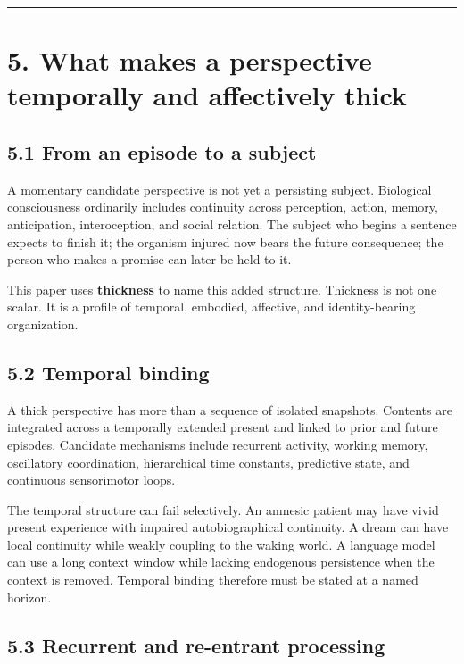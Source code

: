 \documentclass[
  11pt,
]{article}
\begin{document}
\begin{center}\rule{0.5\linewidth}{0.5pt}\end{center}

\section{5. What makes a perspective temporally and affectively
thick}\label{what-makes-a-perspective-temporally-and-affectively-thick}

\subsection{5.1 From an episode to a
subject}\label{from-an-episode-to-a-subject}

A momentary candidate perspective is not yet a persisting subject.
Biological consciousness ordinarily includes continuity across
perception, action, memory, anticipation, interoception, and social
relation. The subject who begins a sentence expects to finish it; the
organism injured now bears the future consequence; the person who makes
a promise can later be held to it.

This paper uses \textbf{thickness} to name this added structure.
Thickness is not one scalar. It is a profile of temporal, embodied,
affective, and identity-bearing organization.

\subsection{5.2 Temporal binding}\label{temporal-binding-1}

A thick perspective has more than a sequence of isolated snapshots.
Contents are integrated across a temporally extended present and linked
to prior and future episodes. Candidate mechanisms include recurrent
activity, working memory, oscillatory coordination, hierarchical time
constants, predictive state, and continuous sensorimotor loops.

The temporal structure can fail selectively. An amnesic patient may have
vivid present experience with impaired autobiographical continuity. A
dream can have local continuity while weakly coupling to the waking
world. A language model can use a long context window while lacking
endogenous persistence when the context is removed. Temporal binding
therefore must be stated at a named horizon.

\subsection{5.3 Recurrent and re-entrant
processing}\label{recurrent-and-re-entrant-processing}
\end{document}
